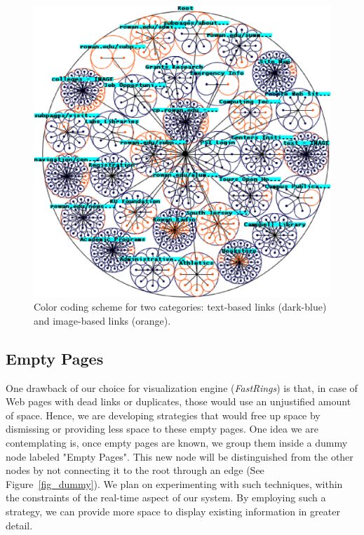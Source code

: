 \documentclass[]{article}
\begin{document}
{\begin{figure}[t]
\centering
\includegraphics[width=5.0in]{images/colored_imagesBETTER}
\caption{Color coding scheme for two categories: text-based links (dark-blue) and image-based links (orange).}
\label{fig_color_nodes}
\end{figure}

\subsection{Empty Pages}
\label{ss:empty_pages}

One drawback of our choice for visualization engine ({\em FastRings}) is that, in case of Web pages with dead links or duplicates, those would use an unjustified amount of space.
Hence, we are developing strategies that would free up space by dismissing or providing less space to these empty pages.
One idea we are contemplating is, once empty pages are known, we group them inside a dummy node labeled "Empty Pages".
This new node will be distinguished from the other nodes by not connecting it to the root through an edge (See Figure~\ref{fig_dummy}).
We plan on experimenting with such techniques, within the constraints of the real-time aspect of our system.
By employing such a strategy, we can provide more space to display existing information in greater detail.

}
\end{document}
